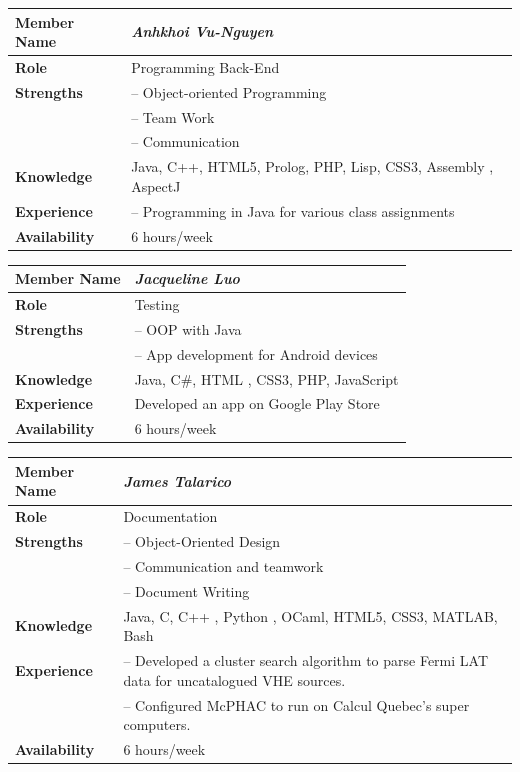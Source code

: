 \documentclass[12pt]{article}
\begin{document}
%
\begin{center}
\begin{tabular}{ p{2.7cm} | p{9cm} }
\hline
\textbf{Member Name}	&	\textit{\textbf{Anhkhoi Vu-Nguyen}}	\\ \hline \hline
\textbf{Role}		&	Programming Back-End	\\ \hline
\textbf{Strengths}	&	-- Object-oriented Programming	\\
					&	-- Team Work	\\
					&	-- Communication	\\ \hline
\textbf{Knowledge}	&	Java, C++, HTML5, Prolog, PHP, Lisp, CSS3, Assembly , AspectJ	\\ \hline
\textbf{Experience}	&	-- Programming in Java for various class assignments 	\\ \hline
\textbf{Availability}	&	6 hours/week	\\ \hline
\end{tabular}
\end{center}
%
\vspace{3mm}
%
\begin{center}
\begin{tabular}{ p{2.7cm} | p{9cm} }
\hline
\textbf{Member Name}	&	\textit{\textbf{Jacqueline Luo}}	\\ \hline \hline
\textbf{Role}		&	Testing	\\ \hline
\textbf{Strengths}	&	-- OOP with Java	\\
					&	-- App development for Android devices	\\ \hline
\textbf{Knowledge}	&	Java, C\#, HTML , CSS3, PHP, JavaScript	\\ \hline
\textbf{Experience}	&	Developed an app on Google Play Store	\\ \hline
\textbf{Availability}	&	6 hours/week	\\ \hline
\end{tabular}
\end{center}
%
\vspace{3mm}
%
\begin{center}
\begin{tabular}{ p{2.7cm} | p{9cm} }
\hline
\textbf{Member Name}	&	\textit{\textbf{James Talarico}}	\\ \hline \hline
\textbf{Role}		&	Documentation	\\ \hline
\textbf{Strengths}	&	-- Object-Oriented Design	\\
					&	-- Communication and teamwork	\\
					&	-- Document Writing	\\ \hline
\textbf{Knowledge}	&	Java, C, C++ , Python , OCaml, HTML5, CSS3, MATLAB, Bash	\\ \hline
\textbf{Experience}	&	-- Developed a cluster search algorithm to parse Fermi LAT data for uncatalogued VHE sources.	\\
					&	-- Configured McPHAC to run on Calcul Quebec's super computers.	\\ \hline
\textbf{Availability}	&	6 hours/week	\\ \hline
\end{tabular}
\end{center}
\end{document}
